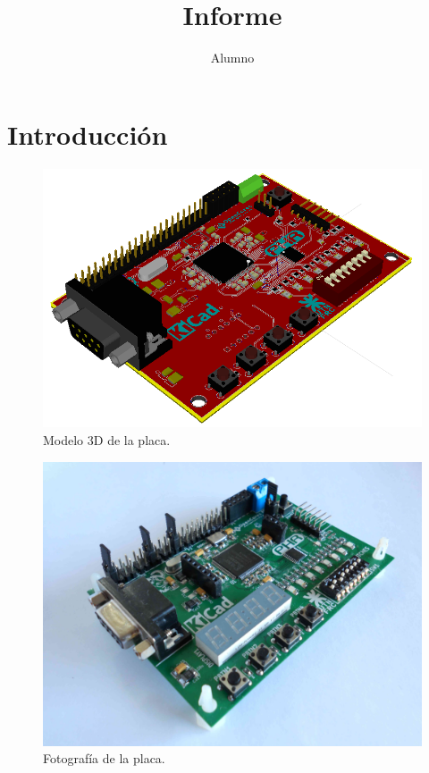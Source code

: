 \documentclass[a5paper]{report}
\title{Informe}
\author{Alumno}
\begin{document}
\maketitle
\chapter{Introducci\'on}
\kant[1-3]
\begin{figure}[h]\centering
  \includegraphics[width=.6\textwidth]
  {board-3d-mod}  
  \caption{Modelo 3D de la placa.}
\end{figure}
\begin{figure}[h]\centering
  \includegraphics[width=.6\textwidth]
  {board-photo}  
  \caption{Fotograf\'ia de la placa.}
\end{figure}
\end{document}
